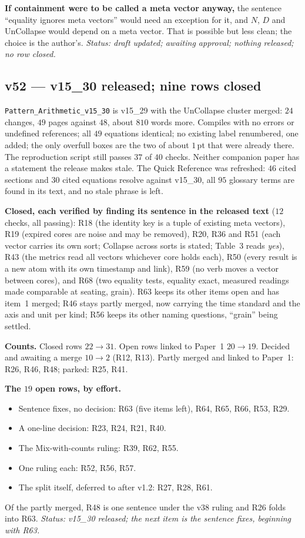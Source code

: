 \documentclass[11pt]{article}
\begin{document}
\textbf{If containment were to be called a meta vector anyway,} the sentence ``equality ignores meta vectors'' would need an exception for it, and $N$, $D$ and UnCollapse would depend on a meta vector. That is possible but less clean; the choice is the author's.
\emph{Status: draft updated; awaiting approval; nothing released; no row closed.}


\subsection*{v52 --- v15\_30 released; nine rows closed}
\texttt{Pattern\_Arithmetic\_v15\_30} is v15\_29 with the UnCollapse cluster merged: $24$ changes, $49$ pages against $48$, about $810$ words more. Compiles with no errors or undefined references; all $49$ equations identical; no existing label renumbered, one added; the only overfull boxes are the two of about $1$\,pt that
were already there. The reproduction script still passes $37$ of $40$ checks. Neither companion paper has a statement the release makes stale. The Quick Reference was refreshed: $46$ cited sections and $30$ cited equations resolve against v15\_30, all $95$ glossary terms are found in its text, and no stale phrase is left.

\textbf{Closed, each verified by finding its sentence in the released text} ($12$ checks, all passing): R18 (the identity key is a tuple of existing meta vectors), R19 (expired cores are noise and may be removed), R20, R36 and R51 (each vector carries its own sort; Collapse across sorts is stated; Table~3 reads \emph{yes}),
R43 (the metrics read all vectors whichever core holds each), R50 (every result is a new atom with its own timestamp and link), R59 (no verb moves a vector between cores), and R68 (two equality tests, equality exact, measured readings made comparable at seating, grain).
R63 keeps its other items open and has item~1 merged; R46 stays partly merged, now carrying the time standard and the axis and unit per kind; R56 keeps its other naming questions, ``grain'' being settled.

\textbf{Counts.} Closed rows $22\to31$. Open rows linked to Paper~1 $20\to19$. Decided and awaiting a merge $10\to2$ (R12, R13). Partly merged and linked to Paper~1: R26, R46, R48; parked: R25, R41.

\textbf{The $19$ open rows, by effort.}
\begin{itemize}
\item Sentence fixes, no decision: R63 (five items left), R64, R65, R66, R53, R29.
\item A one-line decision: R23, R24, R21, R40.
\item The Mix-with-counts ruling: R39, R62, R55.
\item One ruling each: R52, R56, R57.
\item The split itself, deferred to after v1.2: R27, R28, R61.
\end{itemize}
Of the partly merged, R48 is one sentence under the v38 ruling and R26 folds into R63.
\emph{Status: v15\_30 released; the next item is the sentence fixes, beginning with R63.}
\end{document}
